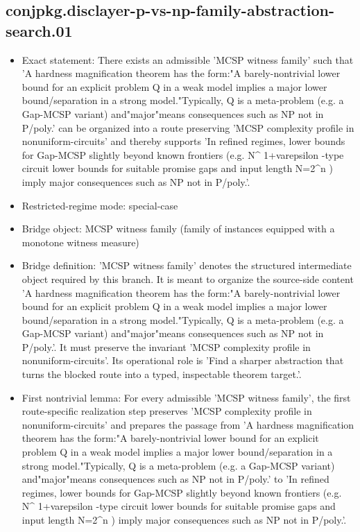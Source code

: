 \documentclass[11pt]{article}
\begin{document}
\subsection*{conjpkg.disclayer-p-vs-np-family-abstraction-search.01}
\begin{itemize}
\item Exact statement: There exists an admissible 'MCSP witness family' such that 'A hardness magnification theorem has the form:"A barely-nontrivial lower bound for an explicit problem Q in a weak model implies a major lower bound/separation in a strong model."Typically, Q is a meta-problem (e.g. a Gap-MCSP variant) and"major"means consequences such as NP not in P/poly.' can be organized into a route preserving 'MCSP complexity profile in nonuniform-circuits' and thereby supports 'In refined regimes, lower bounds for Gap-MCSP slightly beyond known frontiers (e.g. N\textasciicircum{} 1+varepsilon -type circuit lower bounds for suitable promise gaps and input length N=2\textasciicircum{}n ) imply major consequences such as NP not in P/poly.'.
\item Restricted-regime mode: special-case
\item Bridge object: MCSP witness family (family of instances equipped with a monotone witness measure)
\item Bridge definition: 'MCSP witness family' denotes the structured intermediate object required by this branch. It is meant to organize the source-side content 'A hardness magnification theorem has the form:"A barely-nontrivial lower bound for an explicit problem Q in a weak model implies a major lower bound/separation in a strong model."Typically, Q is a meta-problem (e.g. a Gap-MCSP variant) and"major"means consequences such as NP not in P/poly.'. It must preserve the invariant 'MCSP complexity profile in nonuniform-circuits'. Its operational role is 'Find a sharper abstraction that turns the blocked route into a typed, inspectable theorem target.'.
\item First nontrivial lemma: For every admissible 'MCSP witness family', the first route-specific realization step preserves 'MCSP complexity profile in nonuniform-circuits' and prepares the passage from 'A hardness magnification theorem has the form:"A barely-nontrivial lower bound for an explicit problem Q in a weak model implies a major lower bound/separation in a strong model."Typically, Q is a meta-problem (e.g. a Gap-MCSP variant) and"major"means consequences such as NP not in P/poly.' to 'In refined regimes, lower bounds for Gap-MCSP slightly beyond known frontiers (e.g. N\textasciicircum{} 1+varepsilon -type circuit lower bounds for suitable promise gaps and input length N=2\textasciicircum{}n ) imply major consequences such as NP not in P/poly.'.

\end{itemize}
\end{document}
